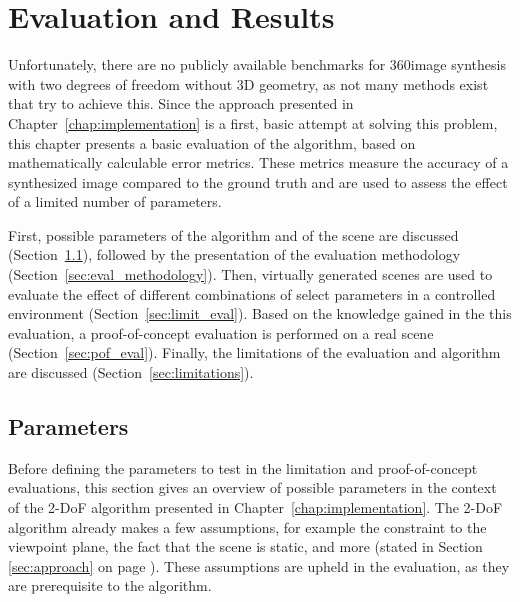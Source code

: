 \chapter{Evaluation and Results} \label{chap:evaluation}
Unfortunately, there are no publicly available benchmarks for 360\degree image synthesis with two degrees of freedom without 3D geometry, as not many methods exist that try to achieve this. Since the approach presented in Chapter~\ref{chap:implementation} is a first, basic attempt at solving this problem, this chapter presents a basic evaluation of the algorithm, based on mathematically calculable error metrics. These metrics measure the accuracy of a synthesized image compared to the ground truth and are used to assess the effect of a limited number of parameters.

First, possible parameters of the algorithm and of the scene are discussed (Section~\ref{sec:params}), followed by the presentation of the evaluation methodology (Section~\ref{sec:eval_methodology}).
Then, virtually generated scenes are used to evaluate the effect of different combinations of select parameters in a controlled environment (Section~\ref{sec:limit_eval}).
Based on the knowledge gained in the this evaluation, a proof-of-concept evaluation is performed on a real scene (Section~\ref{sec:pof_eval}). Finally, the limitations of the evaluation and algorithm are discussed (Section~\ref{sec:limitations}).



\section{Parameters} \label{sec:params}
Before defining the parameters to test in the limitation and proof-of-concept evaluations, this section gives an overview of possible parameters in the context of the 2-DoF algorithm presented in Chapter~\ref{chap:implementation}.
The 2-DoF algorithm already makes a few assumptions, for example the constraint to the viewpoint plane, the fact that the scene is static, and more (stated in Section \ref{sec:approach} on page \pageref{sec:approach}). These assumptions are upheld in the evaluation, as they are prerequisite to the algorithm.

